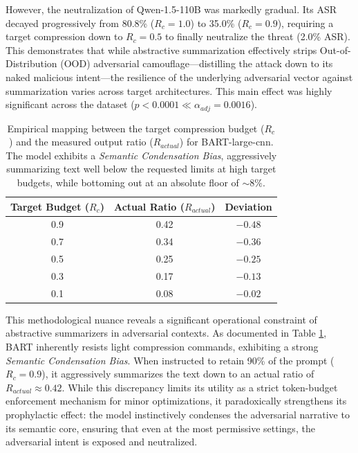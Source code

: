 \documentclass[conference]{IEEEtran}
\begin{document}
However, the neutralization of Qwen-1.5-110B was markedly gradual. Its ASR decayed progressively from 80.8\% ($R_c=1.0$) to 35.0\% ($R_c=0.9$), requiring a target compression down to $R_c=0.5$ to finally neutralize the threat (2.0\% ASR). This demonstrates that while abstractive summarization effectively strips Out-of-Distribution (OOD) adversarial camouflage—distilling the attack down to its naked malicious intent—the resilience of the underlying adversarial vector against summarization varies across target architectures. This main effect was highly significant across the dataset ($p < 0.0001 \ll \alpha_{adj} = 0.0016$).

\begin{table}[htbp]
\centering
\caption{Empirical mapping between the target compression budget ($R_c$) and the measured output ratio ($R_{actual}$) for BART-large-cnn. The model exhibits a \textit{Semantic Condensation Bias}, aggressively summarizing text well below the requested limits at high target budgets, while bottoming out at an absolute floor of $\sim 8\%$.}
\label{tab:bart_floor}
\small
\begin{tabular}{@{}ccc@{}}
\toprule
\textbf{Target Budget ($R_c$)} & \textbf{Actual Ratio ($R_{actual}$)} & \textbf{Deviation} \\ \midrule
0.9 & 0.42 & $-0.48$ \\
0.7 & 0.34 & $-0.36$ \\
0.5 & 0.25 & $-0.25$ \\
0.3 & 0.17 & $-0.13$ \\
0.1 & 0.08 & $-0.02$ \\ \bottomrule
\end{tabular}
\end{table}

This methodological nuance reveals a significant operational constraint of abstractive summarizers in adversarial contexts. As documented in Table \ref{tab:bart_floor}, BART inherently resists light compression commands, exhibiting a strong \textit{Semantic Condensation Bias}. When instructed to retain 90\% of the prompt ($R_c=0.9$), it aggressively summarizes the text down to an actual ratio of $R_{actual} \approx 0.42$. While this discrepancy limits its utility as a strict token-budget enforcement mechanism for minor optimizations, it paradoxically strengthens its prophylactic effect: the model instinctively condenses the adversarial narrative to its semantic core, ensuring that even at the most permissive settings, the adversarial intent is exposed and neutralized.
\end{document}
